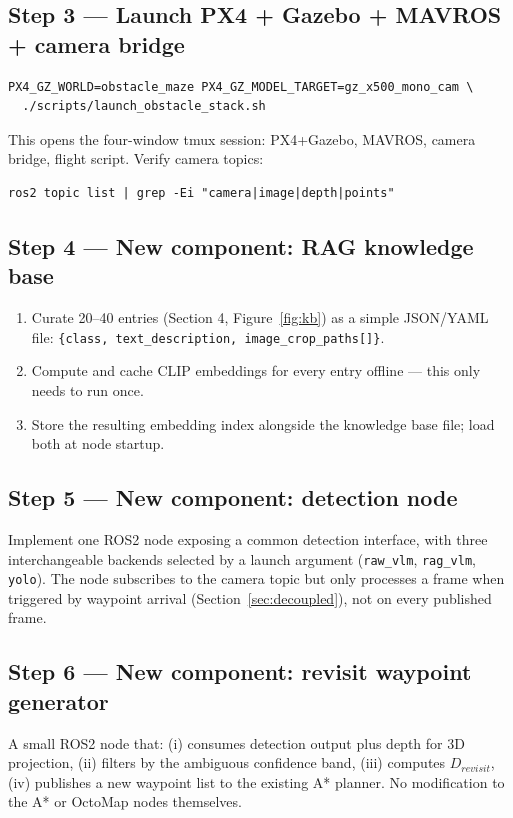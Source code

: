 \documentclass[11pt,a4paper]{article}
\newcommand{\code}[1]{\texttt{\small #1}}
\begin{document}
\subsection{Step 3 --- Launch PX4 + Gazebo + MAVROS + camera bridge}
\begin{verbatim}
PX4_GZ_WORLD=obstacle_maze PX4_GZ_MODEL_TARGET=gz_x500_mono_cam \
  ./scripts/launch_obstacle_stack.sh
\end{verbatim}
This opens the four-window tmux session: PX4+Gazebo, MAVROS, camera bridge, flight script. Verify camera topics:
\begin{verbatim}
ros2 topic list | grep -Ei "camera|image|depth|points"
\end{verbatim}

\subsection{Step 4 --- New component: RAG knowledge base}
\begin{enumerate}
    \item Curate 20--40 entries (Section 4, Figure~\ref{fig:kb}) as a simple JSON/YAML file: \code{\{class, text\_description, image\_crop\_paths[]\}}.
    \item Compute and cache CLIP embeddings for every entry offline --- this only needs to run once.
    \item Store the resulting embedding index alongside the knowledge base file; load both at node startup.
\end{enumerate}

\subsection{Step 5 --- New component: detection node}
Implement one ROS2 node exposing a common detection interface, with three interchangeable backends selected by a launch argument (\code{raw\_vlm}, \code{rag\_vlm}, \code{yolo}). The node subscribes to the camera topic but only processes a frame when triggered by waypoint arrival (Section~\ref{sec:decoupled}), not on every published frame.

\subsection{Step 6 --- New component: revisit waypoint generator}
A small ROS2 node that: (i) consumes detection output plus depth for 3D projection, (ii) filters by the ambiguous confidence band, (iii) computes $D_{revisit}$, (iv) publishes a new waypoint list to the existing A* planner. No modification to the A* or OctoMap nodes themselves.
\end{document}
